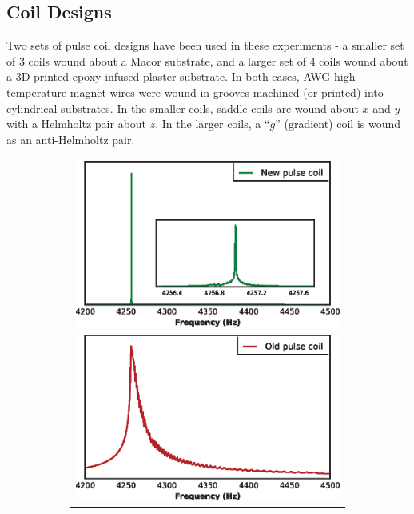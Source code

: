 \documentclass[PaulGanssle-Thesis.tex]{subfiles}
\begin{document}
\subsection{Coil Designs}
\label{nmr.pulsecoil.designs}
Two sets of pulse coil designs have been used in these experiments - a smaller set of 3 coils wound about a Macor substrate, and a larger set of 4 coils wound about a 3D printed epoxy-infused plaster substrate. In both cases, \unit[30]{AWG} high-temperature magnet wires were wound in grooves machined (or printed) into cylindrical substrates. In the smaller coils, saddle coils are wound about $x$ and $y$ with a Helmholtz pair about $z$. In the larger coils, a ``$g$'' (gradient) coil is wound as an anti-Helmholtz pair.

\begin{figure}[t!] 
\centering
\begin{subfigure}[h]{0.3\tw}
\begin{tabular}{c}
\includegraphics[width=\tw]{figures/coils/PCHomogeneityCompNX.eps} \\
\includegraphics[width=\tw]{figures/coils/PCHomogeneityCompOX.eps} 

\end{tabular}
\end{subfigure}
\end{figure}
\end{document}
